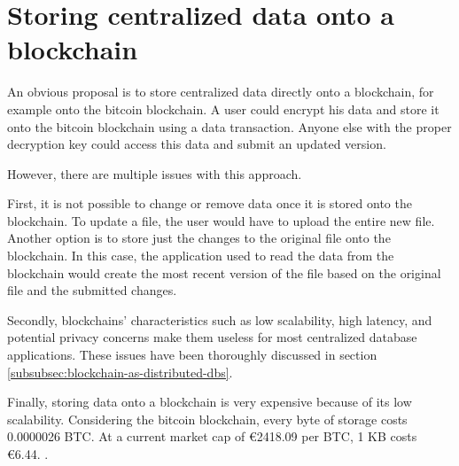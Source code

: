 \section{Storing centralized data onto a blockchain}
\label{store-on-bitcoin}

\iffalse
- very obvious solution would be to store data directly onto a blockchain, eg. the bitcoin blockchain. you would just put all the data, properly encrypted, directly onto the blockchain and it is stored

\fi

An obvious proposal is to store centralized data directly onto a blockchain, for example onto the bitcoin blockchain. A user could encrypt his data and store it onto the bitcoin blockchain using a data transaction. Anyone else with the proper decryption key could access this data and submit an updated version.

\iffalse
- various issues arise: 
  - basic functionality is missing that several applications need: you are not able to change or remove data once stored data, to update a file you would have to store the entire file again or store just the change and have your application reading the blockchain create the most recent file.
  - as mentioned in section \ref{subsubsec:blockchain-as-distributed-dbs}, blockchains deal with low scalability, high latency and potential privacy concerns.
  - insanely expensive: 0.0000026 BTC per byte \cite{bitcoin-transaction-fee}. At a current market cap of €2418.09 per BTC, the cost of storage is €6.44 per KB. \cite{bitcoin-market-cap}
\fi

However, there are multiple issues with this approach. 

First, it is not possible to change or remove data once it is stored onto the blockchain. To update a file, the user would have to upload the entire new file. Another option is to store just the changes to the original file onto the blockchain. In this case, the application used to read the data from the blockchain would create the most recent version of the file based on the original file and the submitted changes. 

Secondly, blockchains' characteristics such as low scalability, high latency, and potential privacy concerns make them useless for most centralized database applications. These issues have been thoroughly discussed in section \ref{subsubsec:blockchain-as-distributed-dbs}.

Finally, storing data onto a blockchain is very expensive because of its low scalability. Considering the bitcoin blockchain, every byte of storage costs 0.0000026 BTC\cite{bitcoin-transaction-fee}. At a current market cap of €2418.09 per BTC, 1 KB costs €6.44. \cite{bitcoin-market-cap}.

